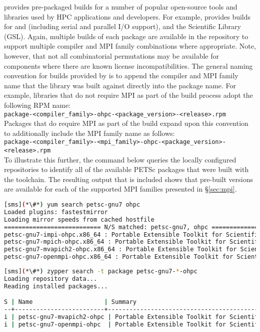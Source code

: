 \OHPC{} provides pre-packaged builds for a number of popular open-source
tools and libraries used by HPC applications and developers. For
example, \OHPC{} provides builds for \FFTW{} and \hdffive{} (including serial and parallel
I/O support), and the \GNU{} Scientific Library (GSL). Again, multiple builds of
each package are available in the \OHPC{} repository to support multiple compiler
and MPI family combinations where appropriate. Note, however, that not all
combinatorial permutations may be available for components where there are known
license incompatibilities. The general naming convention
for builds provided by \OHPC{} is to append the compiler and MPI family name that
the library was built against directly into the package name. For example,
libraries that do not require MPI as part of the build process adopt the
following RPM name: \\

\noindent
\texttt{package-<compiler\_family>-ohpc-<package\_version>-<release>.rpm} \\

\noindent Packages that do require MPI as part of the build expand upon this convention to
additionally include the MPI family name as follows: \\

\noindent
\texttt{package-<compiler\_family>-<mpi\_family>-ohpc-<package\_version>-<release>.rpm} \\

To illustrate this further, the command below queries the locally configured
repositories to identify all of the available PETSc packages that were built
with the \GNU{} toolchain. The resulting output that is included shows that
pre-built versions are available for each of the supported MPI families
presented in \S\ref{sec:mpi}.

\begin{lstlisting}[language=bash,keywords={}]
[sms](*\#*) yum search petsc-gnu7 ohpc
Loaded plugins: fastestmirror
Loading mirror speeds from cached hostfile
=========================== N/S matched: petsc-gnu7, ohpc ===========================
petsc-gnu7-impi-ohpc.x86_64 : Portable Extensible Toolkit for Scientific Computation
petsc-gnu7-mpich-ohpc.x86_64 : Portable Extensible Toolkit for Scientific Computation
petsc-gnu7-mvapich2-ohpc.x86_64 : Portable Extensible Toolkit for Scientific Computation
petsc-gnu7-openmpi-ohpc.x86_64 : Portable Extensible Toolkit for Scientific Computation
\end{lstlisting}
\else
\begin{lstlisting}[language=bash,keepspaces=true,keywords={}]
[sms](*\#*) zypper search -t package petsc-gnu7-*-ohpc
Loading repository data...
Reading installed packages...

S | Name                    | Summary
--+-------------------------+--------------------------------------------------------+--------
i | petsc-gnu7-mvapich2-ohpc | Portable Extensible Toolkit for Scientific Computation | package
i | petsc-gnu7-openmpi-ohpc  | Portable Extensible Toolkit for Scientific Computation | package
\end{lstlisting}
\fi

